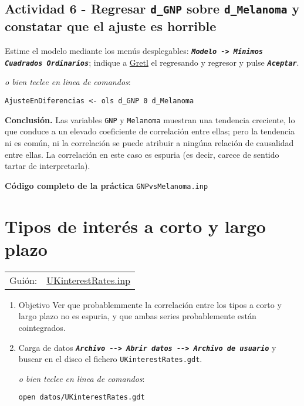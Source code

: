 \documentclass[11pt]{article}
\begin{document}
\subsection{Actividad 6 - Regresar \texttt{d\_GNP} sobre \texttt{d\_Melanoma} y constatar que el ajuste es horrible}
\label{sec:org2530cb2}

Estime el modelo mediante los menús desplegables: \textbf{\emph{\texttt{Modelo -> Mínimos
  Cuadrados Ordinarios}}}; indique a \href{https://gretl.sourceforge.net/es.html}{Gretl} el regresando y regresor y
  pulse \textbf{\emph{\texttt{Aceptar}}}.

{\vspace{0pt} \footnotesize \color{gray!70!black}
\emph{o bien teclee en linea de comandos}:
\begin{verbatim}
AjusteEnDiferencias <- ols d_GNP 0 d_Melanoma
\end{verbatim}
}

\textbf{Conclusión.} Las variables \texttt{GNP} y \texttt{Melanoma} muestran una tendencia
creciente, lo que conduce a un elevado coeficiente de correlación
entre ellas; pero la tendencia ni es común, ni la correlación se puede
atribuir a ningúna relación de causalidad entre ellas. La correlación
en este caso es espuria (es decir, carece de sentido tartar de
interpretarla).

\vspace{10pt}
\noindent
\textbf{Código completo de la práctica} \texttt{GNPvsMelanoma.inp}
\vspace{10pt}

\clearpage


\section{Tipos de interés a corto y largo plazo}
\label{sec:orge3912a0}
\begin{center}
\begin{tabular}{ll}
Guión: & \href{https://github.com/mbujosab/Ectr/tree/master/Practicas/Gretl/scripts/UKinterestRates.inp}{UKinterestRates.inp}\\[0pt]
\end{tabular}
\end{center}

\begin{enumerate}
\item Objetivo
\label{sec:org6e55aaa}
Ver que probablemmente la correlación entre los tipos a corto y largo
plazo no es espuria, y que ambas series probablemente están
cointegrados.

\item Carga de datos
\label{sec:orgff467b8}
\textbf{\emph{\texttt{Archivo -{}-{}> Abrir datos -{}-{}> Archivo de usuario}}} y buscar en el
disco el fichero \texttt{UKinterestRates.gdt}.

{\vspace{0pt} \footnotesize \color{gray!70!black}
\emph{o bien teclee en linea de comandos}:
\begin{verbatim}
open datos/UKinterestRates.gdt
\end{verbatim}
}
\end{enumerate}
\end{document}
